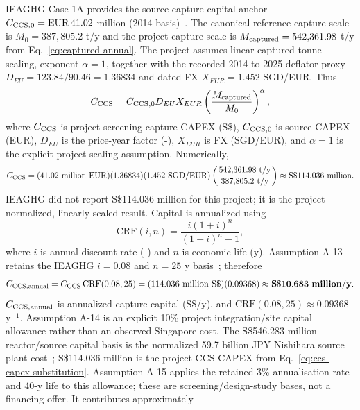IEAGHG Case 1A provides the source capture-capital anchor $C_{\rm CCS,0}=\mathrm{EUR}\,41.02$ million (2014 basis)~\cite{ieaghg2017smr}. The canonical reference capture scale is $M_0=387{,}805.2$ t/y and the project capture scale is $M_{\rm captured}=542{,}361.98$ t/y from Eq.~\ref{eq:captured-annual}. The project assumes linear captured-tonne scaling, exponent $\alpha=1$, together with the recorded 2014-to-2025 deflator proxy $D_{EU}=123.84/90.46=1.36834$ and dated FX $X_{EUR}=1.452$ SGD/EUR. Thus
\begin{equation}\label{eq:ccs-capex-general}
C_{\rm CCS}=C_{\rm CCS,0}D_{EU}X_{EUR}
\left(\frac{M_{\rm captured}}{M_0}\right)^{\alpha},
\end{equation}
where $C_{\rm CCS}$ is project screening capture CAPEX (S\$), $C_{\rm CCS,0}$ is source CAPEX (EUR), $D_{EU}$ is the price-year factor (-), $X_{EUR}$ is FX (SGD/EUR), and $\alpha=1$ is the explicit project scaling assumption. Numerically,
\begin{equation}\label{eq:ccs-capex-substitution}
C_{\rm CCS}
=(41.02~\mathrm{million~EUR})(1.36834)(1.452~\mathrm{SGD/EUR})
\left(\frac{542{,}361.98~\mathrm{t/y}}{387{,}805.2~\mathrm{t/y}}\right)
\approx\mathrm{S\$}114.036~\mathrm{million}.
\end{equation}
IEAGHG did not report S\$114.036 million for this project; it is the project-normalized, linearly scaled result. Capital is annualized using
\begin{equation}\label{eq:crf}
\mathrm{CRF}(i,n)=\frac{i(1+i)^n}{(1+i)^n-1},
\end{equation}
where $i$ is annual discount rate (-) and $n$ is economic life (y). Assumption A-13 retains the IEAGHG $i=0.08$ and $n=25$ y basis~\cite{ieaghg2017smr}; therefore
\begin{equation}\label{eq:ccs-annual-cost}
C_{\rm CCS,annual}=C_{\rm CCS}\,\mathrm{CRF}(0.08,25)
=(114.036~\mathrm{million~S\$})(0.09368)
\approx\mathbf{S\$10.683~million/y}.
\end{equation}
$C_{\rm CCS,annual}$ is annualized capture capital (S\$/y), and $\mathrm{CRF}(0.08,25)\approx0.09368$ y$^{-1}$.
Assumption A-14 is an explicit 10\% project integration/site capital allowance rather than an observed Singapore cost. The S\$546.283 million reactor/source capital basis is the normalized 59.7 billion JPY Nishihara source plant cost~\cite{nishihara2007potential}; S\$114.036 million is the project CCS CAPEX from Eq.~\ref{eq:ccs-capex-substitution}. Assumption A-15 applies the retained 3\% annualisation rate and 40-y life to this allowance; these are screening/design-study bases, not a financing offer. It contributes approximately
